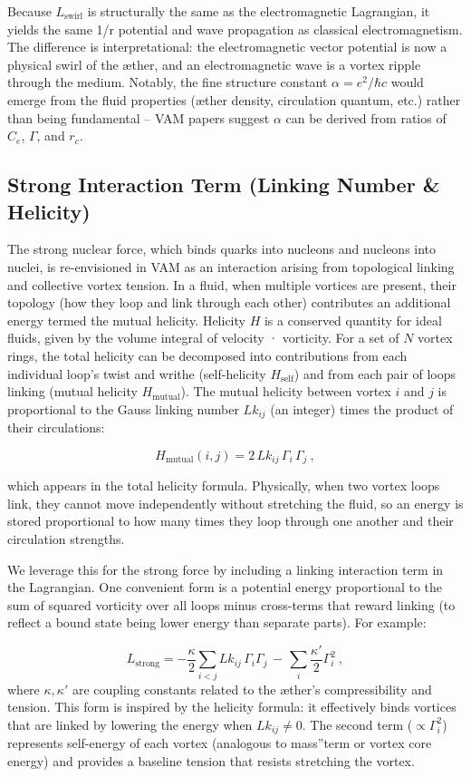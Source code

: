 Because $L_{\text{swirl}}$ is structurally the same as the electromagnetic Lagrangian, it yields the same 1/r potential and wave propagation as classical electromagnetism. The difference is interpretational: the electromagnetic vector potential is now a physical swirl of the æther, and an electromagnetic wave is a vortex ripple through the medium. Notably, the fine structure constant $\alpha = e^2/\hbar c$ would emerge from the fluid properties (æther density, circulation quantum, etc.) rather than being fundamental – VAM papers suggest $\alpha$ can be derived from ratios of $C_e$, $\Gamma$, and $r_c$.


\subsection{Strong Interaction Term (Linking Number \& Helicity)}

The strong nuclear force, which binds quarks into nucleons and nucleons into nuclei, is re-envisioned in VAM as an interaction arising from topological linking and collective vortex tension. In a fluid, when multiple vortices are present, their topology (how they loop and link through each other) contributes an additional energy termed the mutual helicity. Helicity $H$ is a conserved quantity for ideal fluids, given by the volume integral of velocity · vorticity. For a set of $N$ vortex rings, the total helicity can be decomposed into contributions from each individual loop's twist and writhe (self-helicity $H_{\text{self}}$) and from each pair of loops linking (mutual helicity $H_{\text{mutual}}$). The mutual helicity between vortex $i$ and $j$ is proportional to the Gauss linking number $Lk_{ij}$ (an integer) times the product of their circulations:


\[
    H_{\text{mutual}}(i,j) = 2\,Lk_{ij}\,\Gamma_i\,\Gamma_j ~,
\]

which appears in the total helicity formula. Physically, when two vortex loops link, they cannot move independently without stretching the fluid, so an energy is stored proportional to how many times they loop through one another and their circulation strengths.


We leverage this for the strong force by including a linking interaction term in the Lagrangian. One convenient form is a potential energy proportional to the sum of squared vorticity over all loops minus cross-terms that reward linking (to reflect a bound state being lower energy than separate parts). For example:

\[
    L_{\text{strong}} = -\frac{\kappa}{2}\sum_{i<j} Lk_{ij}\,\Gamma_i \Gamma_j \,-\, \sum_i \frac{\kappa'}{2} \Gamma_i^2~,
\]
where $\kappa, \kappa'$ are coupling constants related to the æther's compressibility and tension. This form is inspired by the helicity formula: it effectively binds vortices that are linked by lowering the energy when $Lk_{ij} \neq 0$. The second term ($\propto \Gamma_i^2$) represents self-energy of each vortex (analogous to \grqq mass\textquotedblright term or vortex core energy) and provides a baseline tension that resists stretching the vortex.


